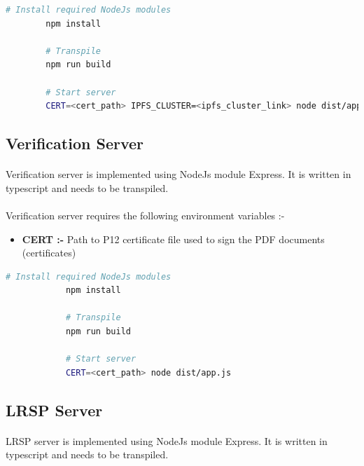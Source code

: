 \documentclass{article}
\begin{document}
        \begin{lstlisting}[language=bash, caption=Records Server]
        # Install required NodeJs modules
        npm install
    
        # Transpile
        npm run build
    
        # Start server
        CERT=<cert_path> IPFS_CLUSTER=<ipfs_cluster_link> node dist/app.js
        \end{lstlisting}
    
    \subsection{Verification Server}
        \paragraph{}
        Verification server is implemented using NodeJs module Express. It is written in typescript and needs to be transpiled.
        
        \paragraph{}
        Verification server requires the following environment variables :-
        \begin{itemize}
            \item \textbf{CERT :-} Path to P12 certificate file used to sign the PDF documents (certificates)
        \end{itemize}
    
        \begin{lstlisting}[language=bash, caption=Verification Server]
            # Install required NodeJs modules
            npm install
        
            # Transpile
            npm run build
        
            # Start server
            CERT=<cert_path> node dist/app.js
            \end{lstlisting}
    
    \subsection{LRSP Server}
        \paragraph{}
        LRSP server is implemented using NodeJs module Express. It is written in typescript and needs to be transpiled.
    
\end{document}
